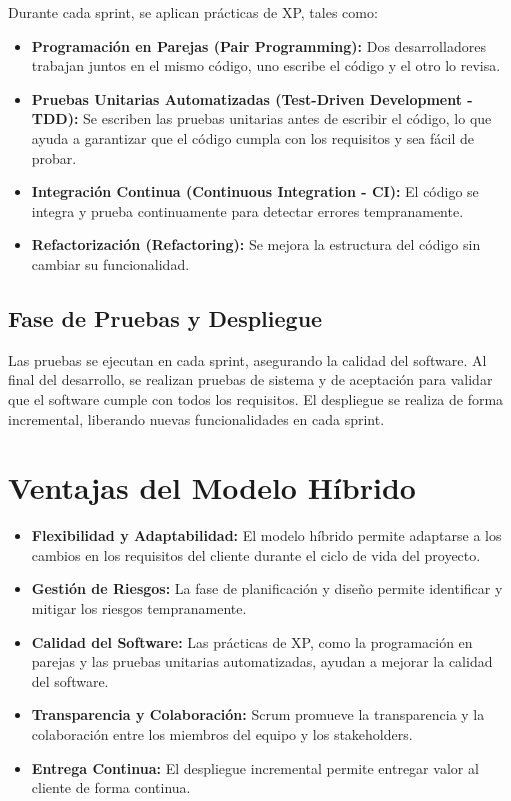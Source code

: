 \documentclass{article}
\begin{document}
Durante cada sprint, se aplican prácticas de XP, tales como:

\begin{itemize}
    \item \textbf{Programación en Parejas (Pair Programming):} Dos desarrolladores trabajan juntos en el mismo código, uno escribe el código y el otro lo revisa.
    \item \textbf{Pruebas Unitarias Automatizadas (Test-Driven Development - TDD):} Se escriben las pruebas unitarias antes de escribir el código, lo que ayuda a garantizar que el código cumpla con los requisitos y sea fácil de probar.
    \item \textbf{Integración Continua (Continuous Integration - CI):} El código se integra y prueba continuamente para detectar errores tempranamente.
    \item \textbf{Refactorización (Refactoring):} Se mejora la estructura del código sin cambiar su funcionalidad.
\end{itemize}

\subsection{Fase de Pruebas y Despliegue}

Las pruebas se ejecutan en cada sprint, asegurando la calidad del software. Al final del desarrollo, se realizan pruebas de sistema y de aceptación para validar que el software cumple con todos los requisitos. El despliegue se realiza de forma incremental, liberando nuevas funcionalidades en cada sprint.

\section{Ventajas del Modelo Híbrido}

\begin{itemize}
    \item \textbf{Flexibilidad y Adaptabilidad:} El modelo híbrido permite adaptarse a los cambios en los requisitos del cliente durante el ciclo de vida del proyecto.
    \item \textbf{Gestión de Riesgos:} La fase de planificación y diseño permite identificar y mitigar los riesgos tempranamente.
    \item \textbf{Calidad del Software:} Las prácticas de XP, como la programación en parejas y las pruebas unitarias automatizadas, ayudan a mejorar la calidad del software.
    \item \textbf{Transparencia y Colaboración:} Scrum promueve la transparencia y la colaboración entre los miembros del equipo y los stakeholders.
    \item \textbf{Entrega Continua:} El despliegue incremental permite entregar valor al cliente de forma continua.
\end{itemize}
\end{document}
